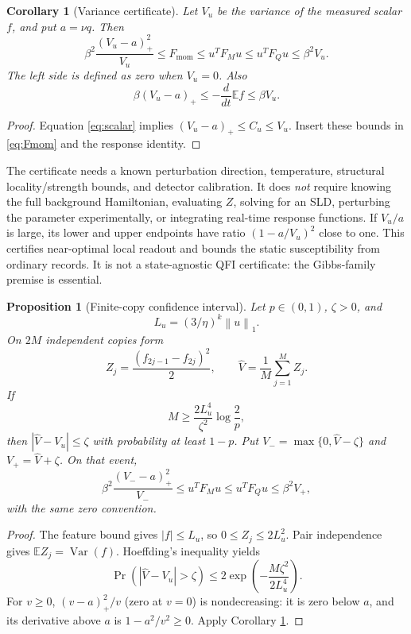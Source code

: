 \documentclass[11pt,a4paper]{article}
\newtheorem{proposition}[theorem]{Proposition}
\newtheorem{corollary}[theorem]{Corollary}
\theoremstyle{remark}
\newcommand{\Var}{\operatorname{Var}}
\newcommand{\E}{\mathbb E}
\newcommand{\norm}[1]{\left\lVert #1\right\rVert}
\newcommand{\pos}[1]{\left(#1\right)_+}
\begin{document}
\begin{corollary}[Variance certificate]\label{cor:certificate}
Let $V_u$ be the variance of the measured scalar $f$, and put $a=\nu q$. Then
\begin{equation}
 \beta^2\frac{\pos{V_u-a}^2}{V_u}
 \le F_{\mathrm{mom}}\le u^TF_Mu\le u^TF_Qu\le\beta^2 V_u.
 \label{eq:certificate}
\end{equation}
The left side is defined as zero when $V_u=0$. Also
\begin{equation}
 \beta\pos{V_u-a}\le -\frac{d}{dt}\E f\le\beta V_u.
 \label{eq:suscert}
\end{equation}
\end{corollary}
\begin{proof}
Equation \eqref{eq:scalar} implies $\pos{V_u-a}\le C_u\le V_u$. Insert these bounds in \eqref{eq:Fmom} and the response identity.
\end{proof}

The certificate needs a known perturbation direction, temperature, structural locality/strength bounds, and detector calibration. It does \emph{not} require knowing the full background Hamiltonian, evaluating $Z$, solving for an SLD, perturbing the parameter experimentally, or integrating real-time response functions. If $V_u/a$ is large, its lower and upper endpoints have ratio $(1-a/V_u)^2$ close to one. This certifies near-optimal local readout and bounds the static susceptibility from ordinary records. It is not a state-agnostic QFI certificate: the Gibbs-family premise is essential.

\begin{proposition}[Finite-copy confidence interval]\label{prop:confidence}
Let $p\in(0,1)$, $\zeta>0$, and
\[
 L_u=(3/\eta)^k\norm{u}_1.
\]
On $2M$ independent copies form
\[
 Z_j=\frac{(f_{2j-1}-f_{2j})^2}{2},\qquad
 \widehat V=\frac1M\sum_{j=1}^M Z_j.
\]
If
\begin{equation}
 M\ge\frac{2L_u^4}{\zeta^2}\log\frac2p,
 \label{eq:shots}
\end{equation}
then $|\widehat V-V_u|\le\zeta$ with probability at least $1-p$. Put $V_- =\max\{0,\widehat V-\zeta\}$ and $V_+=\widehat V+\zeta$. On that event,
\begin{equation}
 \beta^2\frac{\pos{V_--a}^2}{V_-}
 \le u^TF_Mu\le u^TF_Qu\le\beta^2V_+,
 \label{eq:confidence}
\end{equation}
with the same zero convention.
\end{proposition}
\begin{proof}
The feature bound gives $|f|\le L_u$, so $0\le Z_j\le2L_u^2$. Pair independence gives $\E Z_j=\Var(f)$. Hoeffding's inequality yields
\[
 \Pr(|\widehat V-V_u|>\zeta)
 \le2\exp\left(-\frac{M\zeta^2}{2L_u^4}\right).
\]
For $v\ge0$, $\pos{v-a}^2/v$ (zero at $v=0$) is nondecreasing: it is zero below $a$, and its derivative above $a$ is $1-a^2/v^2\ge0$. Apply Corollary \ref{cor:certificate}.
\end{proof}
\end{document}
